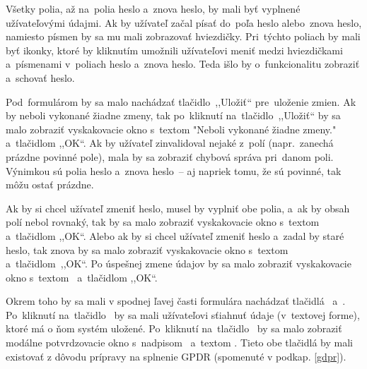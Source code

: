 Všetky polia, až na~polia heslo a~znova heslo, by mali byť vyplnené užívateľovými údajmi. Ak by užívateľ začal písať do~poľa heslo alebo~znova heslo, namiesto písmen by sa mu mali zobrazovať hviezdičky. Pri~týchto poliach by mali byť ikonky, ktoré by kliknutím umožnili užívateľovi meniť medzi hviezdičkami a~písmenami v~poliach heslo a~znova heslo. Teda išlo by o~funkcionalitu zobraziť a~schovať heslo.

Pod~formulárom by sa malo nachádzať tlačidlo~,,Uložiť`` pre~uloženie zmien. Ak by neboli vykonané žiadne zmeny, tak po~kliknutí na~tlačidlo~,,Uložiť`` by sa malo zobraziť vyskakovacie okno s~textom "Neboli vykonané žiadne zmeny." a~tlačidlom ,,OK``. Ak by užívateľ zinvalidoval nejaké z~polí (napr.~zanechá prázdne povinné pole), mala by sa zobraziť chybová správa pri~danom poli. Výnimkou sú polia heslo a~znova heslo~-- aj napriek tomu, že sú povinné, tak môžu ostať prázdne.

Ak by si chcel užívateľ zmeniť heslo, musel by vyplniť obe polia, a~ak by obsah polí nebol rovnaký, tak by sa malo zobraziť vyskakovacie okno s~textom~ a~tlačidlom ,,OK``. Alebo ak by si chcel užívateľ zmeniť heslo a~zadal by staré heslo, tak znova by sa malo zobraziť vyskakovacie okno s~textom~ a~tlačidlom~,,OK``. Po úspešnej zmene údajov by sa malo zobraziť vyskakovacie okno s~textom~ a~tlačidlom ,,OK``.

Okrem toho by sa mali v spodnej ľavej časti formulára nachádzať tlačidlá~ a~. Po~kliknutí na~tlačidlo~ by sa mali užívateľovi sťiahnuť údaje (v~textovej forme), ktoré má o ňom systém uložené. Po~kliknutí na~tlačidlo~ by sa malo zobraziť modálne potvrdzovacie okno s~nadpisom~ a~textom . Tieto obe tlačidlá by mali existovať z dôvodu prípravy na splnenie GPDR (spomenuté v podkap. \ref{gdpr}).
